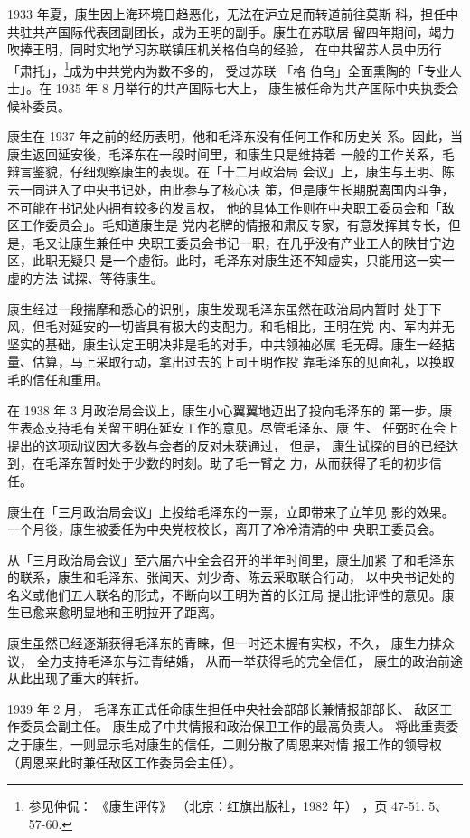 1933 年夏，康生因上海环境日趋恶化，无法在沪立足而转道前往莫斯
科，担任中共驻共产国际代表团副团长，成为王明的副手。康生在苏联居
留四年期间，竭力吹捧王明，同时实地学习苏联镇压机关格伯乌的经验，
在中共留苏人员中历行
「肃托」，\footnote{参见仲侃：
《康生评传》
（北京：红旗出版社，1982 年）
，页 47-51. 5、57-60. 
}成为中共党内为数不多的，
受过苏联
「格
伯乌」全面熏陶的「专业人士」。在 1935 年 8 月举行的共产国际七大上，
康生被任命为共产国际中央执委会候补委员。

康生在 1937 年之前的经历表明，他和毛泽东没有任何工作和历史关
系。因此，当康生返回延安後，毛泽东在一段时间里，和康生只是维持着
一般的工作关系，毛辩言鉴貌，仔细观察康生的表现。在「十二月政治局
会议」上，康生与王明、陈云一同进入了中央书记处，由此参与了核心决
策，但是康生长期脱离国内斗争，不可能在书记处内拥有较多的发言权，
他的具体工作则在中央职工委员会和「敌区工作委员会」。毛知道康生是
党内老牌的情报和肃反专家，有意发挥其专长，但是，毛又让康生兼任中
央职工委员会书记一职，在几乎没有产业工人的陕甘宁边区，此职无疑只
是一个虚衔。此时，毛泽东对康生还不知虚实，只能用这一实一虚的方法
试探、等待康生。

康生经过一段揣摩和悉心的识别，康生发现毛泽东虽然在政治局内暂时
处于下风，但毛对延安的一切皆具有极大的支配力。和毛相比，王明在党
内、军内并无坚实的基础，康生认定王明决非是毛的对手，中共领袖必属
毛无碍。康生一经掂量、估算，马上采取行动，拿出过去的上司王明作投
靠毛泽东的见面礼，以换取毛的信任和重用。

在 1938 年 3 月政治局会议上，康生小心翼翼地迈出了投向毛泽东的
第一步。康生表态支持毛有关留王明在延安工作的意见。尽管毛泽东、康
生、
任弼时在会上提出的这项动议因大多数与会者的反对未获通过，
但是，
康生试探的目的已经达到，在毛泽东暂时处于少数的时刻。助了毛一臂之
力，从而获得了毛的初步信任。

康生在「三月政治局会议」上投给毛泽东的一票，立即带来了立竿见
影的效果。一个月後，康生被委任为中央党校校长，离开了冷冷清清的中
央职工委员会。

从「三月政治局会议」至六届六中全会召开的半年时间里，康生加紧
了和毛泽东的联系，康生和毛泽东、张闻天、刘少奇、陈云采取联合行动，
以中央书记处的名义或他们五人联名的形式，不断向以王明为首的长江局
提出批评性的意见。康生已愈来愈明显地和王明拉开了距离。

康生虽然已经逐渐获得毛泽东的青睐，但一时还未握有实权，不久，
康生力排众议，
全力支持毛泽东与江青结婚，
从而一举获得毛的完全信任，
康生的政治前途从此出现了重大的转折。

1939 年 2 月，
毛泽东正式任命康生担任中央社会部部长兼情报部部长、
敌区工作委员会副主任。
康生成了中共情报和政治保卫工作的最高负责人。
将此重责委之于康生，一则显示毛对康生的信任，二则分散了周恩来对情
报工作的领导权（周恩来此时兼任敌区工作委员会主任）。

